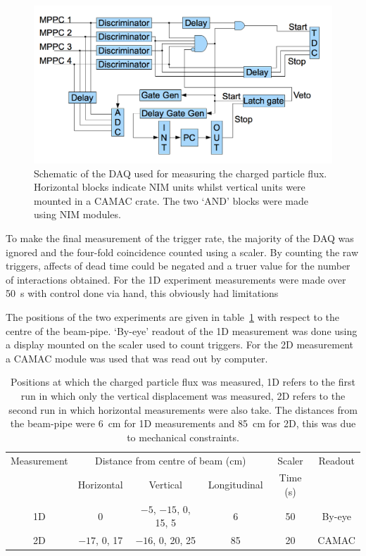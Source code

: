 \begin{figure}[hptb]
  \centering
  \includegraphics[width=.9\textwidth]{images/charged_flux/MuSIC1_DAQ_Block.png}
  \caption{Schematic of the DAQ used for measuring the charged particle flux. Horizontal blocks indicate NIM units whilst vertical units were mounted in a CAMAC crate. The two `AND' blocks were made using NIM modules.}
  \label{fig:MuSIC1_DAQ_Block}
\end{figure}

To make the final measurement of the trigger rate, the majority of the DAQ was ignored and the four-fold coincidence counted using a scaler. By counting the raw triggers, affects of dead time could be negated and a truer value for the number of interactions obtained. For the 1D experiment measurements were made over 50~s with control done via hand, this obviously had limitations 

The positions of the two experiments are given in table~\ref{tab:flux_setup} with respect to the centre of the beam-pipe. `By-eye' readout of the 1D measurement was done using a display mounted on the scaler used to count triggers. For the 2D measurement a CAMAC module was used that was read out by computer.
\begin{table}
  \begin{center}
    \begin{tabular}{c|c|c|c|c|c}
      Measurement  &  \multicolumn{3}{c|}{Distance from centre of beam (cm)}         &  Scaler    &  Readout \\
      &    Horizontal    &       Vertical              &  Longitudinal  &  Time (s)  &          \\
      \hline            
      1D           &  0               &  \(-5\), \(-15\), 0, 15, 5  &       6        &  50        & By-eye   \\
      2D           &  \(-17\), 0, 17  &  \(-16\), 0, 20, 25         &       85       &  20        & CAMAC    \\
    \end{tabular}
  \end{center}
  \caption{Positions at which the charged particle flux was measured, 1D refers to the first run in which only the vertical displacement was measured, 2D refers to the second run in which horizontal measurements were also take. The distances from the beam-pipe were 6~cm for 1D measurements and 85~cm for 2D, this was due to mechanical constraints.}
  \label{tab:flux_setup}
\end{table}

